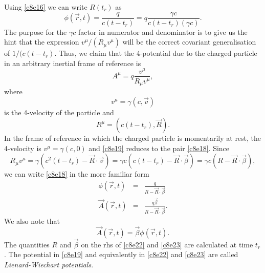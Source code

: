 \begin{enumerate}
Using \eqref{c8e16} we can write $R(t_r)$ as
\begin{equation}\label{c8e18}
\phi(\vec{r}, t) = \frac{q}{c(t - t_r)}=q\frac{\gamma c}{c(t - t_r)(\gamma c)}.
\end{equation}
The purpose for the $\gamma c$ factor in numerator and denominator is to give
us the hint that the expression $v^\mu/(R_\mu v^\mu)$ will be the correct
covariant generalisation of $1/(c(t - t_r)$. Thus, we claim that the 4-potential
due to the charged particle in an arbitrary inertial frame of reference is
\begin{equation}\label{c8e19}
A^\mu = q\frac{v^\mu}{R_\mu v^\mu},
\end{equation}
where
\begin{equation}\label{c8e20}
v^\mu = \gamma(c, \vec{v})
\end{equation}
is the 4-velocity of the particle and
\begin{equation}\label{c8e21}
R^\mu = (c(t - t_r), \vec{R}).
\end{equation}
In the frame of reference in which the charged particle is momentarily at rest,
the 4-velocity is $v^\mu = \gamma(c, 0)$ and \eqref{c8e19} reduces to the pair
\eqref{c8e18}. Since 
\[
R_\mu v^\mu = \gamma(c^2(t - t_r) - \vec{R}\cdot\vec{v}) = \gamma c(c(t-t_r) 
- \vec{R}\cdot\vec{\beta}) = \gamma c(R - \vec{R}\cdot\vec{\beta}),
\]
we can write \eqref{c8e18} in the more familiar form
\begin{eqnarray}
\phi(\vec{r}, t) &=& \frac{q}{R - \vec{R}\cdot\vec{\beta}} \label{c8e22} \\
\vec{A}(\vec{r}, t) &=& \frac{q\vec{\beta}}{R - \vec{R}\cdot\vec{\beta}}.
\label{c8e23}
\end{eqnarray}
We also note that
\begin{equation}\label{c8e24}
\vec{A}(\vec{r}, t) = \vec{\beta}\phi(\vec{r}, t).
\end{equation}
The quantities $R$ and $\vec{\beta}$ on the rhs of \eqref{c8e22} and 
\eqref{c8e23} are calculated at time $t_r$. The potential in \eqref{c8e19} and
equivalently in \eqref{c8e22} and \eqref{c8e23} are called 
\emph{Lienard-Wiechart potentials}.


\end{enumerate}
